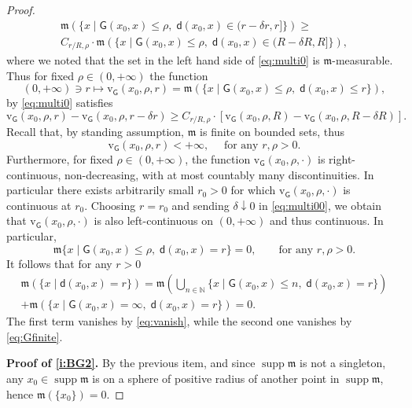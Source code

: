 \documentclass[11pt,a4paper]{article}
\theoremstyle{plain}
\theoremstyle{definition}
\theoremstyle{remark}
\numberwithin{equation}{section}
\newcommand{\N}{\mathbb{N}} %
\DeclareMathOperator{\supp}{\mathrm{supp}}
\newcommand{\rv}{\mathrm{v}}
\newcommand{\mm}{\mathfrak m}
\newcommand{\sfd}{\mathsf d}
\newcommand{\sfG}{\mathsf G}
\begin{document}
\begin{proof}
\begin{multline}
\mm\left(\{x \mid \sfG(x_0,x) \leq \rho,\; \sfd(x_0,x) \in (r- \delta r,r]\}\right) \geq  \\
C_{r/R,\rho}  \cdot \mm\left(\{x\mid\sfG(x_0,x)\leq\rho,\;  \sfd(x_0,x) \in (R-\delta R, R]\}\right),
\end{multline}
where we noted that the set in the left hand side of \eqref{eq:multi0} is $\mm$-measurable. Thus for fixed $\rho \in (0,+\infty)$ the function
\begin{equation}\label{eq:342}
(0,+\infty) \ni r \mapsto \rv_{\sfG}(x_0,\rho,r) = \mm\left(\{x\mid \sfG(x_0,x) \leq \rho,\; \sfd(x_0,x) \leq r \}\right),
\end{equation}
by \eqref{eq:multi0} satisfies
\begin{equation}\label{eq:multi00}
\rv_{\sfG}(x_0,\rho,r)-\rv_{\sfG}(x_0,\rho,r-\delta r) \geq C_{r/R,\rho}\cdot \left[\rv_{\sfG}(x_0,\rho,R)-\rv_{\sfG}(x_0,\rho,R-\delta R)\right].
\end{equation}
Recall that, by standing assumption, $\mm$ is finite on bounded sets, thus
\begin{equation}
\rv_{\sfG}(x_0,\rho,r) < +\infty,\quad \text{ for any $r,\rho>0$.}
\end{equation}
Furthermore, for fixed $\rho\in (0,+\infty)$, the function $\rv_{\sfG}(x_0,\rho,\cdot)$ is right-continuous, non-decreasing, with at most countably many discontinuities. In particular there exists arbitrarily small $r_0>0$ for which $\rv_{\sfG}(x_0,\rho,\cdot)$ is continuous at $r_0$. Choosing $r=r_0$ and sending $\delta \downarrow 0$ in \eqref{eq:multi00}, we obtain that $\rv_{\sfG}(x_0,\rho,\cdot)$ is also left-continuous on $(0,+\infty)$ and thus continuous. In particular, 
\begin{equation}\label{eq:vanish}
\mm\{x \mid \sfG(x_0,x)\leq \rho,\; \sfd(x_0,x) = r\}=0, \qquad \text{for any $r,\rho>0$}.
\end{equation}
It follows that for any $r>0$
\begin{multline}
\mm\left(\{x\mid \sfd(x_{0}, x)= r\}\right) =  \mm\left(\bigcup_{n\in \N}\{x\mid \sfG(x_0,x)\leq n,\; \sfd(x_{0}, x)= r\}\right) \\ + \mm\left(\{x\mid \sfG(x_0,x)=\infty,\; \sfd(x_{0}, x)= r\}\right) = 0.
\end{multline}
The first term vanishes by \eqref{eq:vanish}, while the second one vanishes by \eqref{eq:Gfinite}.

\textbf{Proof of \ref{i:BG2}.} By the previous item, and since $\supp\mm$ is not a singleton, any $x_0 \in \supp\mm$ is on a sphere of positive radius of another point in $\supp\mm$, hence $\mm(\{x_0\})=0$.


\end{proof}
\end{document}
